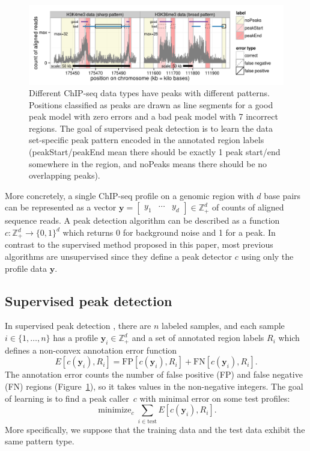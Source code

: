 \documentclass{article}
\DeclareMathOperator*{\minimize}{minimize}
\newcommand{\ZZ}{\mathbb Z}
\begin{document}
\begin{figure}[b!]
  \centering
  \includegraphics[width=\textwidth]{figure-dp-peaks-train}
  \vskip -0.5cm
  \caption{Different ChIP-seq data types have peaks with different
    patterns. Positions classified as peaks are drawn as line segments
    for a \textcolor{good}{good peak model} with zero errors and a
    \textcolor{bad}{bad peak model} with 7 incorrect regions. The goal
    of supervised peak detection is to learn the data set-specific
    peak pattern encoded in the annotated region labels
    (\colorbox{peakStart}{peakStart}/\colorbox{peakEnd}{peakEnd} mean
    there should be exactly 1 peak start/end somewhere in the region,
    and \colorbox{noPeaks}{noPeaks} means there should be no
    overlapping peaks).}
  \label{fig:dp-peaks-train}
\end{figure}

More concretely, a single ChIP-seq profile on a genomic region with
$d$ base pairs can be represented as a vector $\mathbf y= \left[
  \begin{array}{ccc}
    y_1 & \cdots & y_d
  \end{array}
\right]\in\ZZ_+^d$ of counts of aligned sequence reads. A peak
detection algorithm can be described as a function $c:\ZZ_+^d
\rightarrow \{0, 1\}^d$ which returns 0 for background noise and 1 for
a peak. In contrast to the
supervised method proposed in this paper, most previous algorithms are
unsupervised since they define a peak detector $c$ using only the
profile data $\mathbf y$.

\subsection{Supervised peak detection}

In supervised peak detection \citep{hocking2014visual}, there
are $n$ labeled samples, and each sample $i\in\{1, \dots, n\}$ has a
profile $\mathbf y_i\in\ZZ_+^d$ and a set of annotated region labels $R_i$
which defines a non-convex annotation error function
\begin{equation}
  \label{eq:error}
  E[c(\mathbf y_i),  R_i] =
  \text{FP}[c(\mathbf y_i), R_i] +
  \text{FN}[c(\mathbf y_i), R_i].
\end{equation}
The annotation error counts the number of false positive (FP) and
false negative (FN) regions (Figure~\ref{fig:dp-peaks-train}), so it
takes values in the non-negative integers. The goal of learning is to
find a peak caller~$c$ with minimal error on some test profiles:
\begin{equation}
  \label{eq:min_error}
  \minimize_c \sum_{i\in\text{test}} E[c(\mathbf y_i),  R_i].
\end{equation}
More specifically, we suppose that the training data and the test data
exhibit the same pattern type.
\end{document}
